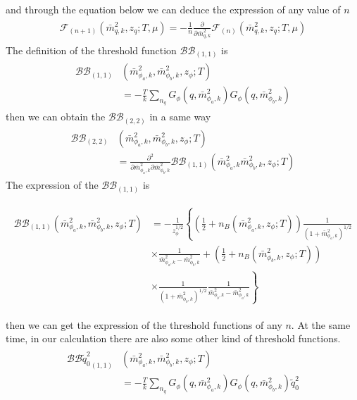 \documentclass[%
reprint,
superscriptaddress,
showpacs,preprintnumbers,
 amsmath,amssymb,
 aps,
prd,
]{revtex4-1}
\begin{document}
and through the equation below we can deduce the expression of any value of $n$
\begin{align}
\begin{split}
\mathcal{F}_{(n+1)}(\bar{m}^{2}_{q,k},z_q;T,\mu)=-\frac{1}{n}\frac{\partial}{\partial\bar{m}^{2}_{q,k}}\mathcal{F}_{(n)}
(\bar{m}^{2}_{q,k},z_q;T,\mu)
\end{split}
\end{align} 
The definition of the threshold function $\mathcal{BB}_{(1,1)}$ is
\begin{align}
\begin{split}
\mathcal{BB}_{(1,1)}&(\bar{m}^{2}_{\phi_a,k},\bar{m}^{2}_{\phi_b,k},z_\phi;T)\\
&=-\frac{T}{k}\sum_{n_q}G_\phi(q,\bar{m}^{2}_{\phi_a,k})G_\phi(q,\bar{m}^{2}_{\phi_b,k})
\end{split}
\end{align} 
then we can obtain the $\mathcal{BB}_{(2,2)}$ in a same way
\begin{align}
\begin{split}
\mathcal{BB}_{(2,2)}&(\bar{m}^{2}_{\phi_a,k},\bar{m}^{2}_{\phi_b,k},z_\phi;T)\\
&=\frac{\partial^2}{\partial\bar{m}^{2}_{\phi_a,k}\partial\bar{m}^{2}_{\phi_b,k}}\mathcal{BB}_{(1,1)}(\bar{m}^{2}_{\phi_a,k}
\bar{m}^{2}_{\phi_b,k},z_\phi;T)
\end{split}
\end{align} 
The expression of the $\mathcal{BB}_{(1,1)}$ is 
\begin{widetext}
\begin{align}
\begin{split}
\mathcal{BB}_{(1,1)}(\bar{m}^{2}_{\phi_a,k},\bar{m}^{2}_{\phi_b,k},z_\phi;T)&=-\frac{1}{z^{1/2}_{\phi}}\left\{ \left( 
\frac{1}{2}+n_B(\bar{m}^{2}_{\phi_a,k},z_\phi;T) \right)\frac{1}{(1+\bar{m}^{2}_{\phi_a,k})^{1/2}} \right. \\
&\left.\times \frac{1}{\bar{m}^{2}_{\phi_a,k}-\bar{m}^{2}_{\phi_b,k}}+\left( \frac{1}{2}+n_B(\bar{m}^{2}_{\phi_b,k},z_\phi;T) 
\right)\right. \\
&\left.\times \frac{1}{(1+\bar{m}^{2}_{\phi_b,k})^{1/2}}\frac{1}{\bar{m}^{2}_{\phi_b,k}-\bar{m}^{2}_{\phi_a,k}}\right\}
\end{split}
\end{align} 
\end{widetext}
then we can get the expression of the threshold functions of any $n$.
At the same time, in our calculation there are also some other kind of threshold functions.
\begin{align}
\begin{split}
{\mathcal{BB}\tilde{q}_0^2}_{(1,1)}&(\bar{m}^{2}_{\phi_a,k},\bar{m}^{2}_{\phi_b,k},z_\phi;T)\\
&=-\frac{T}{k}\sum_{n_q}G_\phi(q,\bar{m}^{2}_{\phi_a,k})G_\phi(q,\bar{m}^{2}_{\phi_b,k})\tilde{q}_0^2
\end{split}
\end{align}
\end{document}
